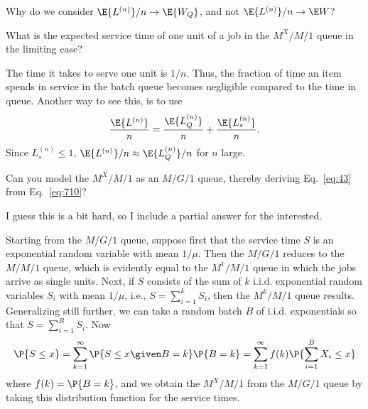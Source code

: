\begin{exercise}
 Why do we consider $\E{L^{(n)}}/n \to \E{W_Q}$, and not
 $\E{L^{(n)}}/n \to \E W$? 
\begin{hint}
What is the expected service time of one
 unit of a job in the $M^X/M/1$ queue in the limiting case?
\end{hint}
\begin{solution}
 The time it takes to serve one unit is $1/n$. Thus, the fraction
 of time an item spends in service in the batch queue becomes negligible compared
 to the time in queue. Another way to see this, is to use 
 \begin{equation*}
 \frac{\E{L^{(n)}}}n = 
 \frac{\E{L^{(n)}_Q}}n + \frac{\E{L^{(n)}_s}}n.
 \end{equation*}
Since $L^{(n)}_s \leq 1$, $\E{L^{(n)}}/n \approx \E{L^{(n)}_Q}/n$ for $n$ large.
\end{solution}
\end{exercise}

 
\begin{exercise}
Can you model the $M^X/M/1$ as an $M/G/1$ queue, thereby deriving Eq.~\cref{eq:43} from Eq.~\cref{eq:710}? 
\begin{solution}
I guess this is a bit hard, so I include a partial answer for the interested. 


Starting from the $M/G/1$ queue, suppose first that the service time
$S$ is an exponential random variable with mean $1/\mu$. Then the
$M/G/1$ reduces to the $M/M/1$ queue, which is evidently equal to
the $M^1/M/1$ queue in which the jobs arrive as single units. Next, if
$S$ consists of the sum of $k$ i.i.d. exponential random variables
$S_i$ with mean $1/\mu$, i.e., $S=\sum_{i=1}^k S_i$, then the
$M^k/M/1$ queue results. Generalizing still further, we can take a
random batch $B$ of i.i.d. exponentials so that $S = \sum_{i=1}^B S_i$. Now
\begin{equation*}
 \P{S\leq x}
= \sum_{k=1}^\infty \P{S \leq x\given B=k}\P{B=k}
= \sum_{k=1}^\infty f(k) \P{\sum_{i=1}^B X_i \leq x}
\end{equation*}
where $f(k)=\P{B=k}$, and we obtain the $M^X/M/1$ from the $M/G/1$
queue by taking this distribution function for the service times.
\end{solution}
\end{exercise}




